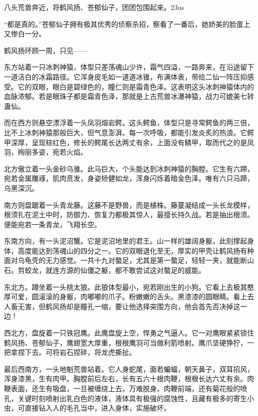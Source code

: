 
\begin{this_body}

八头荒兽奔近，将鹤风扬、苍郁仙子，团团包围起来。23us

“都是真的。”苍郁仙子拥有极其优秀的侦察杀招，察看了一番后，她娇美的脸蛋上又惨白一分。

鹤风扬环顾一周，只见——

东方站着一只冰刺神猿，体型只差荡魂山少许，霜气四溢，一路奔来，在沿途留下一道洁白的冰霜路径。它浑身皮毛如一道道冰锥，布满体表，带给二仙一阵压抑感受。它的双眼，眼白是碧绿色的，瞳仁则是霜青色泽。这表明这头冰刺神猿体内的血脉浓郁。若是眼珠子都是霜青色泽，那就是上古荒兽冰瀑神猿，战力可媲美七转蛊仙。

而在西方则悬空漂浮着一头凤羽熔岩鳄。这头鳄鱼，体型只是寻常鳄鱼的两三倍，比不上冰刺神猿那般巨大，但气息澎湃。每一次呼吸，都能引发炎炙的热浪。它鳄甲深厚，呈现棕红色，修长的鳄尾长达两丈有余，上面没有鳞甲，取而代之的是凤羽，绚丽多姿，宛若火焰。

北方傲立着一头金砂乌骓。此马巨大，个头能达到冰刺神猿的胸膛。它生有六蹄，宛若金属雕琢，肌肉贲发，身姿矫健如龙，浑身闪烁着暗金色泽。唯有六只马蹄，乌黑深沉。

南方则盘踞着一头青龙藤。这藤不是野兽，而是植株。藤蔓凝结成一头长龙模样，根须扎在泥土中时，防御力、恢复力都极其惊人，最擅长持久战。若是抽出根须。便能宛若一条青龙，飞翔长空。

东南方向，有一头泥沼蟹。它是泥沼地里的君王。山一样的雄阔身躯，此刻撑起身体，高度能达到荡魂山的四分之一。它的双眼退化至无，厚实的甲壳让鹤风扬有种面对乌龟壳的无力感觉。一共十九对螯足，尤其是第一螯足，轻轻一夹，就能断山石。剪蛟龙，就连方源的仙僵之躯，都不敢尝试这对螯足的威能。

东北方。蹲坐着一头桃太狼。此狼体型最小，宛若刚出生的小狗。它看上去极其憨厚可爱，圆滚滚的身躯，肉嘟嘟的爪子。粉嫩嫩的舌头。黑漆漆的圆眼睛。看上去人畜无害，但鹤风扬却是瞳孔一缩，要让他选择突围方向，他会首先否决掉这一边！

西北方，盘旋着一只铁冠鹰。此鹰盘旋上空，悍勇之气逼人。它一对鹰眼紧紧锁住鹤风扬、苍郁仙子，鹰翅宽大厚重，根根鹰羽可当做利箭喷射。鹰爪坚硬狰狞，一把拿捏下去。可将岩石捏碎，将龙虎撕扯。

最后西南方，一头地魁荒兽站着。它人身蛇尾，面若蝙蝠，朝天鼻子，双耳招风，浑身漆黑，生有肉甲。胸膛前后左右，长有五六十根肉鞭，根根长达六丈有余。肉鞭表面，还生有吸盘，一旦被缠绕上去，万难脱身。肉鞭前端，还有菊花般的喷孔，关键时刻喷射出乳白色的液体，液体具有极强的腐蚀性，且藏有极多的寄生小虫，可直接钻入人的毛孔当中，进入身体，实施破坏。


\end{this_body}
